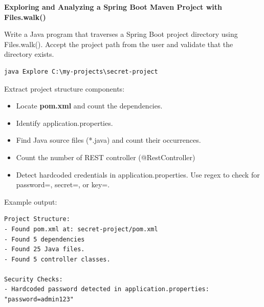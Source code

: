 \begin{oefening}

\textbf{Exploring and Analyzing a Spring Boot Maven Project with Files.walk()}

Write a Java program that traverses a Spring Boot project directory using Files.walk(). Accept the project path from the user and validate that the directory exists.

\begin{verbatim}
java Explore C:\my-projects\secret-project
\end{verbatim}

Extract project structure components:
\begin{itemize}
\item Locate \textbf{pom.xml} and count the dependencies.
\item Identify application.properties.
\item Find Java source files (*.java) and count their occurrences.
\item Count the number of REST controller (@RestController)
\item Detect hardcoded credentials in application.properties. Use regex to check for password=, secret=, or key=.
\end{itemize}

Example output:
\begin{verbatim}
Project Structure:
- Found pom.xml at: secret-project/pom.xml
- Found 5 dependencies
- Found 25 Java files.
- Found 5 controller classes.

Security Checks:
- Hardcoded password detected in application.properties: "password=admin123"
\end{verbatim}

\end{oefening}

